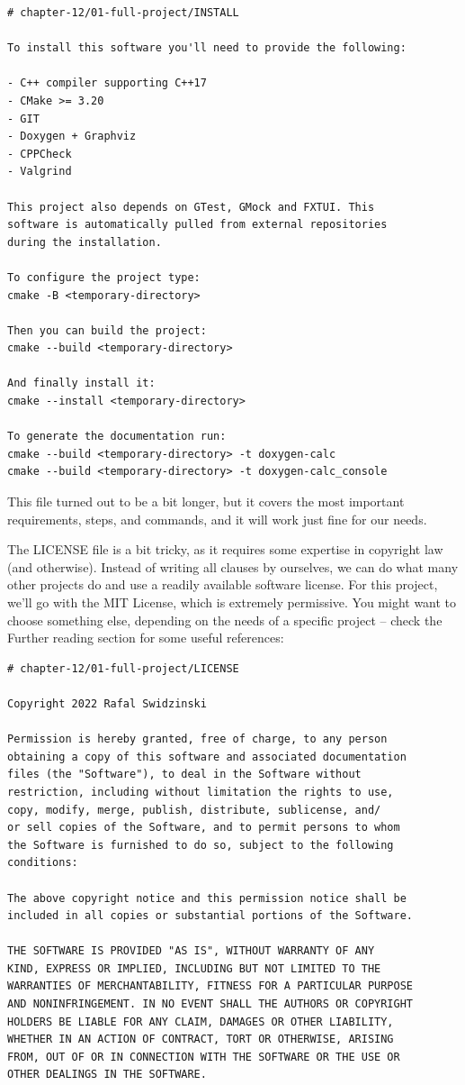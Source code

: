 \begin{lstlisting}[style=stylePython]
# chapter-12/01-full-project/INSTALL

To install this software you'll need to provide the following:

- C++ compiler supporting C++17
- CMake >= 3.20
- GIT
- Doxygen + Graphviz
- CPPCheck
- Valgrind

This project also depends on GTest, GMock and FXTUI. This
software is automatically pulled from external repositories
during the installation.

To configure the project type:
cmake -B <temporary-directory>

Then you can build the project:
cmake --build <temporary-directory>

And finally install it:
cmake --install <temporary-directory>

To generate the documentation run:
cmake --build <temporary-directory> -t doxygen-calc
cmake --build <temporary-directory> -t doxygen-calc_console
\end{lstlisting}

This file turned out to be a bit longer, but it covers the most important requirements, steps, and commands, and it will work just fine for our needs.

The LICENSE file is a bit tricky, as it requires some expertise in copyright law (and otherwise). Instead of writing all clauses by ourselves, we can do what many other projects do and use a readily available software license. For this project, we'll go with the MIT License, which is extremely permissive. You might want to choose something else, depending on the needs of a specific project – check the Further reading section for some useful references:

\begin{lstlisting}[style=stylePython]
# chapter-12/01-full-project/LICENSE

Copyright 2022 Rafal Swidzinski

Permission is hereby granted, free of charge, to any person
obtaining a copy of this software and associated documentation
files (the "Software"), to deal in the Software without
restriction, including without limitation the rights to use,
copy, modify, merge, publish, distribute, sublicense, and/
or sell copies of the Software, and to permit persons to whom
the Software is furnished to do so, subject to the following
conditions:

The above copyright notice and this permission notice shall be
included in all copies or substantial portions of the Software.

THE SOFTWARE IS PROVIDED "AS IS", WITHOUT WARRANTY OF ANY
KIND, EXPRESS OR IMPLIED, INCLUDING BUT NOT LIMITED TO THE
WARRANTIES OF MERCHANTABILITY, FITNESS FOR A PARTICULAR PURPOSE
AND NONINFRINGEMENT. IN NO EVENT SHALL THE AUTHORS OR COPYRIGHT
HOLDERS BE LIABLE FOR ANY CLAIM, DAMAGES OR OTHER LIABILITY,
WHETHER IN AN ACTION OF CONTRACT, TORT OR OTHERWISE, ARISING
FROM, OUT OF OR IN CONNECTION WITH THE SOFTWARE OR THE USE OR
OTHER DEALINGS IN THE SOFTWARE.
\end{lstlisting}

